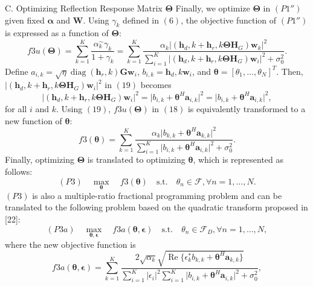 \documentclass[review]{elsarticle}
\begin{document}
		C. Optimizing Reflection Response Matrix $\boldsymbol{\Theta}$
		Finally, we optimize $\boldsymbol{\Theta}$ in $(P1'')$ given fixed $\boldsymbol{\alpha}$ and $\mathbf{W}$.
		Using $\gamma_k$ defined in $(6)$, the objective function of $(P1'')$ is
		expressed as a function of $\boldsymbol{\Theta}$:
		\[
		f3u(\boldsymbol{\Theta}) = \sum_{k=1}^{K} \frac{\alpha_k^\sim \gamma_k}{{1 + \gamma_k}} = \sum_{k=1}^{K} \frac{\alpha_k \lvert ( \mathbf{h}_d,k + \mathbf{h}_r,k\boldsymbol{\Theta}\mathbf{H}_G ) \mathbf{w}_k \rvert^2}{{\sum_{i=1}^{K} \lvert ( \mathbf{h}_d,k + \mathbf{h}_r,k\boldsymbol{\Theta}\mathbf{H}_G ) \mathbf{w}_i \rvert^2 + \sigma_0^2}}.
		\]
		Define $a_{i,k} = \sqrt{\eta} \operatorname{diag}(\mathbf{h}_r,k)\mathbf{G}\mathbf{w}_i$, $b_{i,k} = \mathbf{h}_d,k\mathbf{w}_i$, and $\boldsymbol{\theta} = [\theta_1, \ldots, \theta_N]^T$. Then, $\lvert ( \mathbf{h}_d,k + \mathbf{h}_r,k\boldsymbol{\Theta}\mathbf{H}_G ) \mathbf{w}_i \rvert^2$ in $(19)$ becomes
		\[
		\lvert ( \mathbf{h}_d,k + \mathbf{h}_r,k\boldsymbol{\Theta}\mathbf{H}_G ) \mathbf{w}_i \rvert^2 = \lvert b_{i,k} + \boldsymbol{\theta}^H \mathbf{a}_{i,k} \rvert^2 = \lvert b_{i,k} + \boldsymbol{\theta}^H \mathbf{a}_{i,k} \rvert^2,
		\]
		for all $i$ and $k$. Using $(19)$, $f3u(\boldsymbol{\Theta})$ in $(18)$ is equivalently transformed to a new function of $\boldsymbol{\theta}$:
		\[
		f3(\boldsymbol{\theta}) = \sum_{k=1}^{K} \frac{\alpha_k \lvert b_{k,k} + \boldsymbol{\theta}^H \mathbf{a}_{k,k} \rvert^2}{{\sum_{i=1}^{K} \lvert b_{i,k} + \boldsymbol{\theta}^H \mathbf{a}_{i,k} \rvert^2 + \sigma_0^2}}.
		\]
		Finally, optimizing $\boldsymbol{\Theta}$ is translated to optimizing $\boldsymbol{\theta}$, which is represented as follows:
		\[
		(P3) \quad \max_{\boldsymbol{\theta}} \quad f3(\boldsymbol{\theta}) \quad \text{s.t.} \quad \theta_n \in \mathcal{F}, \forall n = 1, \ldots, N.
		\]
		$(P3)$ is also a multiple-ratio fractional programming problem and can be translated to the following problem based on the quadratic transform proposed in [22]:
		\[
		(P3a) \quad \max_{\boldsymbol{\theta}, \boldsymbol{\epsilon}} \quad f3a(\boldsymbol{\theta}, \boldsymbol{\epsilon}) \quad \text{s.t.} \quad \theta_n \in \mathcal{F}_D, \forall n = 1, \ldots, N,
		\]
		where the new objective function is
		\[
		f3a(\boldsymbol{\theta}, \boldsymbol{\epsilon}) = \sum_{k=1}^{K} \frac{2\sqrt{\alpha_k}\sqrt{\operatorname{Re} \{\epsilon_k^* b_{k,k} + \boldsymbol{\theta}^H \mathbf{a}_{k,k}\}}}{{\sum_{i=1}^{K} \lvert \epsilon_i \rvert^2 \sum_{i=1}^{K} \lvert b_{i,k} + \boldsymbol{\theta}^H \mathbf{a}_{i,k} \rvert^2 + \sigma_0^2}},
		\]
\end{document}

